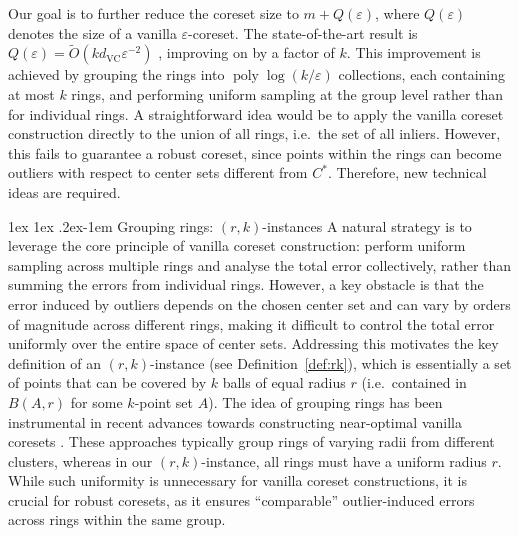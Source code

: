 \documentclass[11pt,letterpaper]{article}
\makeatletter
\renewcommand{\paragraph}{%
  \@startsection{paragraph}{4}%
  {\z@}{1ex \@plus 1ex \@minus .2ex}{-1em}%
  {\normalfont\normalsize\bfseries}%
}
\theoremstyle{definition}
\newcommand{\eps}{\varepsilon}
\newcommand{\VC}{\ensuremath{\mathrm{VC}}}
\DeclareMathOperator{\poly}{poly}
\makeatother
\begin{document}
Our goal is to further reduce the coreset size to \( m + Q(\eps) \), where \( Q(\eps) \) denotes the size of a vanilla \( \eps \)-coreset.  
%
The state-of-the-art result is \( Q(\eps) = \tilde{O}(k d_{\VC} \eps^{-2}) \) \cite{Cohen25}, improving on \cite{huang2022near} by a factor of \( k \).  
%
This improvement is achieved by grouping the rings into \( \poly\log (k/\eps) \) collections, each containing at most \( k \) rings, and performing uniform sampling at the group level rather than for individual rings.  
%
A straightforward idea would be to apply the vanilla coreset construction directly to the union of all rings, i.e.\ the set of all inliers.
%
However, this fails to guarantee a robust coreset, since points within the rings can become outliers with respect to center sets different from \( C^\ast \). 
%
Therefore, new technical ideas are required. 
%

\paragraph{Grouping rings: $(r,k)$-instances}
A natural strategy is to leverage the core principle of vanilla coreset construction: perform uniform sampling across multiple rings and analyse the total error collectively, rather than summing the errors from individual rings.
% 
However, a key obstacle is that the error induced by outliers depends on the chosen center set and can vary by orders of magnitude across different rings, making it difficult to control the total error uniformly over the entire space of center sets.
%
Addressing this motivates the key definition of an \((r,k)\)-instance (see Definition~\ref{def:rk}), which is essentially a set of points that can be covered by \(k\) balls of equal radius \(r\) (i.e.\ contained in \(B(A, r)\) for some $k$-point set $A$). 
%
The idea of grouping rings has been instrumental in recent advances towards constructing near-optimal vanilla coresets \cite{cohen2021new,Cohen2022Towards,cohen2022improved,huang2024optimal,Cohen25}.
%
These approaches typically group rings of varying radii from different clusters, whereas in our \((r,k)\)-instance, all rings must have a uniform radius \(r\).
%
While such uniformity is unnecessary for vanilla coreset constructions, it is crucial for robust coresets, as it ensures ``comparable'' outlier-induced errors across rings within the same group.
\end{document}
